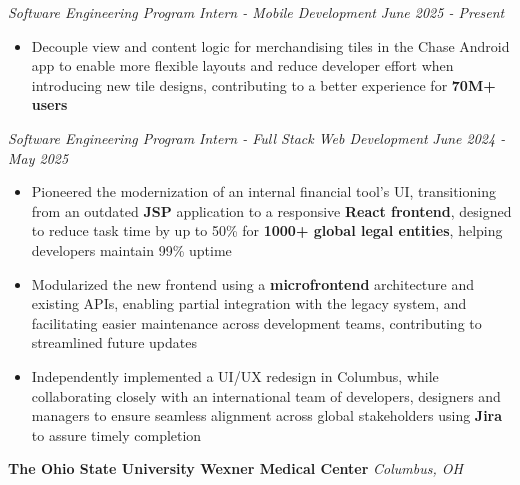 \documentclass[letterpaper]{article}
\newenvironment{tightitemize}{%
  \begin{itemize}\small\setlength{\baselineskip}{0.95\baselineskip}\itemsep -1mm%
}{\end{itemize}}
\begin{document}
    \textit{Software Engineering Program Intern - Mobile Development} \hfill \textsl{June 2025 - Present}\\
    \vspace{-7pt}
    \begin{tightitemize} \itemsep -1mm

            \item Decouple view and content logic for merchandising tiles in the Chase Android app to enable more flexible layouts and reduce developer effort when introducing new tile designs, contributing to a better experience for \textbf{70M+ users}
                    
    \end{tightitemize}
    \textit{Software Engineering Program Intern - Full Stack Web Development} \hfill \textsl{June 2024 - May 2025}\\
    \vspace{-7pt}
    \begin{tightitemize} \itemsep -1mm

            \item Pioneered the modernization of an internal financial tool’s UI, transitioning from an outdated \textbf{JSP} application to a responsive \textbf{React frontend}, designed to reduce task time by up to 50\% for \textbf{1000+ global legal entities}, helping developers maintain 99\% uptime

            \item Modularized the new frontend using a \textbf{microfrontend} architecture and existing APIs, enabling partial integration with the legacy system, and facilitating easier maintenance across development teams, contributing to streamlined future updates
            
            \item Independently implemented a UI/UX redesign in Columbus, while collaborating closely with an international team of developers, designers and managers to ensure seamless alignment across global stakeholders using \textbf{Jira} to assure timely completion
        
    \end{tightitemize}
    \vspace{-2mm}

    \textbf{The Ohio State University Wexner Medical Center} \hfill \textsl{Columbus, OH}\\
    
\end{document}
